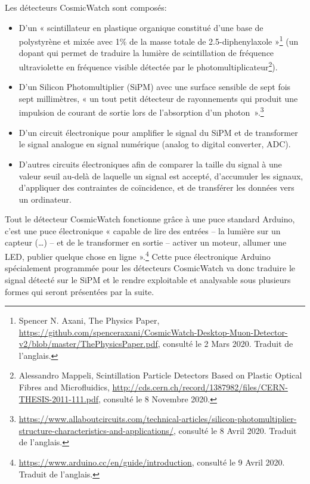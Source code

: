 \documentclass[a4paper, 12pt]{article}
\begin{document}
\begin{spacing}{1.5}
Les détecteurs CosmicWatch sont composés:
\begin{itemize}
  \item D'un « scintillateur en plastique organique constitué d'une base de polystyrène et mixée avec 1\% de la masse totale de 2.5-diphenylaxole »\footnote{Spencer N. Axani, The Physics Paper, \url{https://github.com/spenceraxani/CosmicWatch-Desktop-Muon-Detector-v2/blob/master/ThePhysicsPaper.pdf}, consulté le 2 Mars 2020. Traduit de l'anglais.} (un dopant qui permet de traduire la lumière de scintillation de fréquence ultraviolette en fréquence visible détectée par le photomultiplicateur\footnote{Alessandro Mappeli, Scintillation Particle Detectors Based on Plastic Optical Fibres and Microfluidics, \url{http://cds.cern.ch/record/1387982/files/CERN-THESIS-2011-111.pdf}, consulté le 8 Novembre 2020.}).
  \item D’un Silicon Photomultiplier (SiPM) avec une surface sensible de sept fois sept millimètres, « un tout petit détecteur de rayonnements qui produit une impulsion de courant de sortie lors de l’absorption d’un photon~».\footnote{\url{https://www.allaboutcircuits.com/technical-articles/silicon-photomultiplier-structure-characteristics-and-applications/}, consulté le 8 Avril 2020. Traduit de l'anglais.}
  \item D'un circuit électronique pour amplifier le signal du SiPM et de transformer le signal analogue en signal numérique (analog to digital converter, ADC).
  \item D'autres circuits électroniques afin de comparer la taille du signal à une valeur seuil au-delà de laquelle un signal est accepté, d'accumuler les signaux, d'appliquer des contraintes de coïncidence, et de transférer les données vers un ordinateur.
\end{itemize}

Tout le détecteur CosmicWatch fonctionne grâce à une puce standard Arduino, c'est une puce électronique « capable de lire des entrées – la lumière sur un capteur (…) – et de le transformer en sortie – activer un moteur, allumer une LED, publier quelque chose en ligne ».\footnote{\url{https://www.arduino.cc/en/guide/introduction}, consulté le 9 Avril 2020. Traduit de l'anglais.} Cette puce électronique Arduino spécialement programmée pour les détecteurs CosmicWatch va donc traduire le signal détecté sur le SiPM et le rendre exploitable et analysable sous plusieurs formes qui seront présentées par la suite.


\end{spacing}
\end{document}
